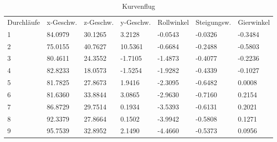 \documentclass[a4paper,12pt]{scrartcl}
\begin{document}
\begin{table}
\centering
\caption{Kurvenflug}
\begin{tabular}{lllllll}
Durchläufe & x-Geschw. & z-Geschw. & y-Geschw. & Rollwinkel & Steigungsw. & Gierwinkel  \\
1          & 84.0979   & 30.1265   & 3.2128    & -0.0543    & -0.0326     & -0.3484     \\
2          & 75.0155   & 40.7627   & 10.5361   & -0.6684    & -0.2488     & -0.5803     \\
3          & 80.4611   & 24.3552   & -1.7105   & -1.4873    & -0.4077     & -0.2236     \\
4          & 82.8233   & 18.0573   & -1.5254   & -1.9282    & -0.4339     & -0.1027     \\
5          & 81.7825   & 27.8673   & 1.9416    & -2.3095    & -0.6482     & 0.0008      \\
6          & 81.6360   & 33.8844   & 3.0865    & -2.9630    & -0.7160     & 0.2154      \\
7          & 86.8729   & 29.7514   & 0.1934    & -3.5393    & -0.6131     & 0.2021      \\
8          & 92.3379   & 27.8664   & 0.1502    & -3.9942    & -0.5808     & 0.1271      \\
9          & 95.7539   & 32.8952   & 2.1490    & -4.4660    & -0.5373     & 0.0956     
\end{tabular}
\end{table}
 
\end{document}
